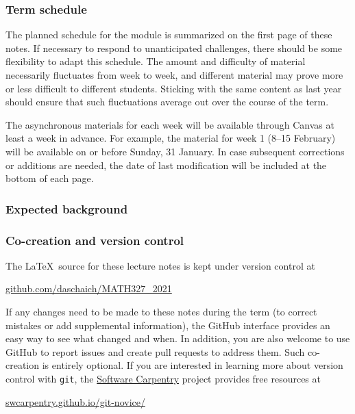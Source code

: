 \subsubsection*{Term schedule}
The planned schedule for the module is summarized on the first page of these notes.
If necessary to respond to unanticipated challenges, there should be some flexibility to adapt this schedule.
The amount and difficulty of material necessarily fluctuates from week to week, and different material may prove more or less difficult to different students.
Sticking with the same content as last year should ensure that such fluctuations average out over the course of the term.

The asynchronous materials for each week will be available through Canvas at least a week in advance.
For example, the material for week 1 (8--15 February) will be available on or before Sunday, 31 January.
In case subsequent corrections or additions are needed, the date of last modification will be included at the bottom of each page.








\subsubsection*{Expected background}

\subsubsection*{Co-creation and version control}
The \LaTeX\ source for these lecture notes is kept under version control at \\
\centerline{\href{https://github.com/daschaich/MATH327_2021}{github.com/daschaich/MATH327\_2021}}
If any changes need to be made to these notes during the term (to correct mistakes or add supplemental information), the GitHub interface provides an easy way to see what changed and when.
In addition, you are also welcome to use GitHub to report issues and create pull requests to address them.
Such co-creation is entirely optional.
If you are interested in learning more about version control with \texttt{git}, the \href{https://software-carpentry.org}{Software Carpentry} project provides free resources at \\
\centerline{\href{https://swcarpentry.github.io/git-novice/}{swcarpentry.github.io/git-novice/}}



